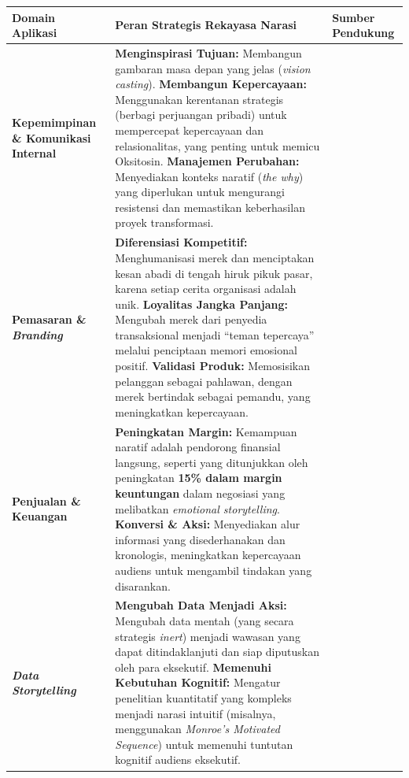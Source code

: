 \documentclass[
  letterpaper,
  DIV=11,
  numbers=noendperiod]{scrreprt}
\begin{document}
\begin{longtable}[]{@{}
  >{\raggedright\arraybackslash}p{}
  >{\raggedright\arraybackslash}p{}
  >{\raggedright\arraybackslash}p{}@{}}
\toprule\noalign{}
\begin{minipage}[b]{\linewidth}\raggedright
Domain Aplikasi
\end{minipage} & \begin{minipage}[b]{\linewidth}\raggedright
Peran Strategis Rekayasa Narasi
\end{minipage} & \begin{minipage}[b]{\linewidth}\raggedright
Sumber Pendukung
\end{minipage} \\
\midrule\noalign{}
\endhead
\bottomrule\noalign{}
\endlastfoot
\textbf{Kepemimpinan \& Komunikasi Internal} & \textbf{Menginspirasi
Tujuan:} Membangun gambaran masa depan yang jelas (\emph{vision
casting}). \textbf{Membangun Kepercayaan:} Menggunakan kerentanan
strategis (berbagi perjuangan pribadi) untuk mempercepat kepercayaan dan
relasionalitas, yang penting untuk memicu Oksitosin. \textbf{Manajemen
Perubahan:} Menyediakan konteks naratif (\emph{the why}) yang diperlukan
untuk mengurangi resistensi dan memastikan keberhasilan proyek
transformasi. & \\
\textbf{Pemasaran \& \emph{Branding}} & \textbf{Diferensiasi
Kompetitif:} Menghumanisasi merek dan menciptakan kesan abadi di tengah
hiruk pikuk pasar, karena setiap cerita organisasi adalah unik.
\textbf{Loyalitas Jangka Panjang:} Mengubah merek dari penyedia
transaksional menjadi ``teman tepercaya'' melalui penciptaan memori
emosional positif. \textbf{Validasi Produk:} Memosisikan pelanggan
sebagai pahlawan, dengan merek bertindak sebagai pemandu, yang
meningkatkan kepercayaan. & \\
\textbf{Penjualan \& Keuangan} & \textbf{Peningkatan Margin:} Kemampuan
naratif adalah pendorong finansial langsung, seperti yang ditunjukkan
oleh peningkatan \textbf{15\% dalam margin keuntungan} dalam negosiasi
yang melibatkan \emph{emotional storytelling}. \textbf{Konversi \&
Aksi:} Menyediakan alur informasi yang disederhanakan dan kronologis,
meningkatkan kepercayaan audiens untuk mengambil tindakan yang
disarankan. & \\
\textbf{\emph{Data Storytelling}} & \textbf{Mengubah Data Menjadi Aksi:}
Mengubah data mentah (yang secara strategis \emph{inert}) menjadi
wawasan yang dapat ditindaklanjuti dan siap diputuskan oleh para
eksekutif. \textbf{Memenuhi Kebutuhan Kognitif:} Mengatur penelitian
kuantitatif yang kompleks menjadi narasi intuitif (misalnya, menggunakan
\emph{Monroe's Motivated Sequence}) untuk memenuhi tuntutan kognitif
audiens eksekutif. & \\
\end{longtable}
\end{document}
